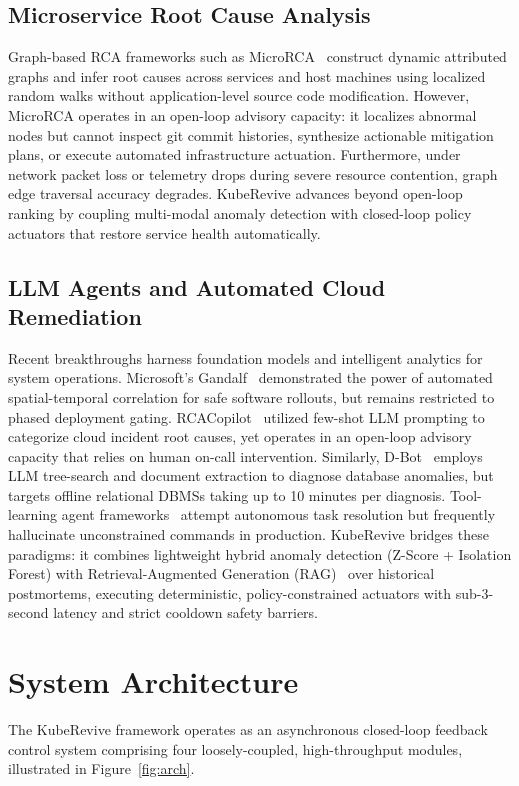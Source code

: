 \documentclass[conference]{IEEEtran}
\begin{document}
\subsection{Microservice Root Cause Analysis}
Graph-based RCA frameworks such as MicroRCA~\cite{microrca2020} construct dynamic attributed graphs and infer root causes across services and host machines using localized random walks without application-level source code modification. However, MicroRCA operates in an open-loop advisory capacity: it localizes abnormal nodes but cannot inspect git commit histories, synthesize actionable mitigation plans, or execute automated infrastructure actuation. Furthermore, under network packet loss or telemetry drops during severe resource contention, graph edge traversal accuracy degrades. KubeRevive advances beyond open-loop ranking by coupling multi-modal anomaly detection with closed-loop policy actuators that restore service health automatically.

\subsection{LLM Agents and Automated Cloud Remediation}
Recent breakthroughs harness foundation models and intelligent analytics for system operations. Microsoft's Gandalf~\cite{gandalf2020} demonstrated the power of automated spatial-temporal correlation for safe software rollouts, but remains restricted to phased deployment gating. RCACopilot~\cite{rcacopilot2024} utilized few-shot LLM prompting to categorize cloud incident root causes, yet operates in an open-loop advisory capacity that relies on human on-call intervention. Similarly, D-Bot~\cite{dbot2024} employs LLM tree-search and document extraction to diagnose database anomalies, but targets offline relational DBMSs taking up to 10 minutes per diagnosis. Tool-learning agent frameworks~\cite{llm_devops2023} attempt autonomous task resolution but frequently hallucinate unconstrained commands in production. KubeRevive bridges these paradigms: it combines lightweight hybrid anomaly detection (Z-Score + Isolation Forest) with Retrieval-Augmented Generation (RAG)~\cite{rag_lewis2020} over historical postmortems, executing deterministic, policy-constrained actuators with sub-3-second latency and strict cooldown safety barriers.

\section{System Architecture}
The KubeRevive framework operates as an asynchronous closed-loop feedback control system comprising four loosely-coupled, high-throughput modules, illustrated in Figure~\ref{fig:arch}.
\end{document}
